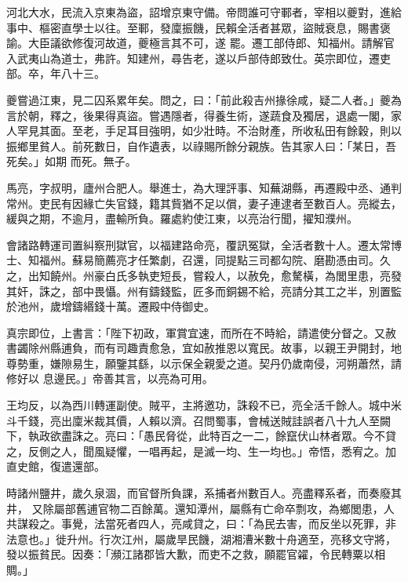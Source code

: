 \begin{pinyinscope}
 河北大水，民流入京東為盜，詔增京東守備。帝問誰可守鄆者，宰相以夔對，進給事中、樞密直學士以往。至鄆，發廩振饑，民賴全活者甚眾，盜賊衰息，賜書褒諭。大臣議欲修復河故道，夔極言其不可，遂
 罷。遷工部侍郎、知福州。請解官入武夷山為道士，弗許。知建州，尋告老，遂以戶部侍郎致仕。英宗即位，遷吏部。卒，年八十三。



 夔嘗過江東，見二囚系累年矣。問之，曰：「前此殺吉州掾徐咸，疑二人者。」夔為言於朝，釋之，後果得真盜。嘗遇隱者，得養生術，遂蔬食及獨居，退處一閣，家人罕見其面。至老，手足耳目強明，如少壯時。不治財產，所收私田有餘穀，則以振鄉里貧人。前死數日，自作遺表，以祿賜所餘分親族。告其家人曰：「某日，吾死矣。」如期
 而死。無子。



 馬亮，字叔明，廬州合肥人。舉進士，為大理評事、知蕪湖縣，再遷殿中丞、通判常州。吏民有因緣亡失官錢，籍其貲猶不足以償，妻子連逮者至數百人。亮縱去，緩與之期，不逾月，盡輸所負。羅處約使江東，以亮治行聞，擢知濮州。



 會諸路轉運司置糾察刑獄官，以福建路命亮，覆訊冤獄，全活者數十人。遷太常博士、知福州。蘇易簡薦亮才任繁劇，召還，同提點三司都勾院、磨勘憑由司。久
 之，出知饒州。州豪白氏多執吏短長，嘗殺人，以赦免，愈驁橫，為閭里患，亮發其奸，誅之，部中畏懾。州有鑄錢監，匠多而銅錫不給，亮請分其工之半，別置監於池州，歲增鑄緡錢十萬。遷殿中侍御史。



 真宗即位，上書言：「陛下初政，軍賞宜速，而所在不時給，請遣使分督之。又赦書蠲除州縣逋負，而有司趣責愈急，宜如赦推恩以寬民。故事，以親王尹開封，地尊勢重，嫌隙易生，願鑒其繇，以示保全親愛之道。契丹仍歲南侵，河朔蕭然，請修好以
 息邊民。」帝善其言，以亮為可用。



 王均反，以為西川轉運副使。賊平，主將邀功，誅殺不已，亮全活千餘人。城中米斗千錢，亮出廩米裁其價，人賴以濟。召問蜀事，會械送賊詿誤者八十九人至闕下，執政欲盡誅之。亮曰：「愚民脅從，此特百之一二，餘竄伏山林者眾。今不貸之，反側之人，聞風疑懼，一唱再起，是滅一均、生一均也。」帝悟，悉宥之。加直史館，復遣還部。



 時諸州鹽井，歲久泉涸，而官督所負課，系捕者州數百人。亮盡釋系者，而奏廢其井，
 又除屬部舊逋官物二百餘萬。還知潭州，屬縣有亡命卒剽攻，為鄉閭患，人共謀殺之。事覺，法當死者四人，亮咸貸之，曰：「為民去害，而反坐以死罪，非法意也。」徙升州。行次江州，屬歲旱民饑，湖湘漕米數十舟適至，亮移文守將，發以振貧民。因奏：「瀕江諸郡皆大歉，而吏不之救，願罷官糴，令民轉粟以相賙。」




\end{pinyinscope}
